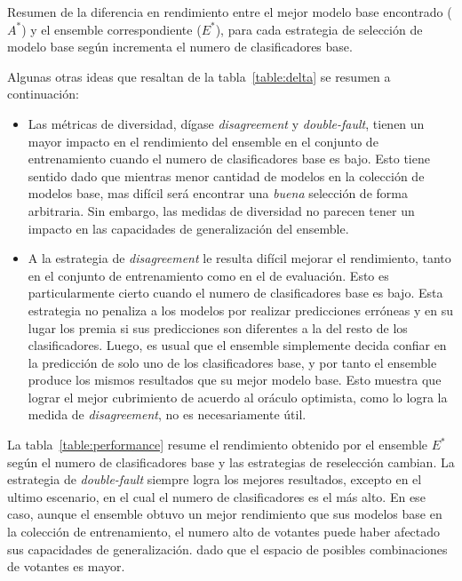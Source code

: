 \begin{table}[H]
    \caption{Resumen de la diferencia en rendimiento entre el mejor modelo base encontrado ($A^*$) y el ensemble correspondiente ($E^*$), para cada estrategia de selección de modelo base según incrementa el numero de clasificadores base.}
    \label{table:delta}
\end{table}

Algunas otras ideas que resaltan de la tabla~\ref{table:delta} se resumen a continuación:

\begin{itemize}
    \item
    Las métricas de diversidad, dígase \emph{disagreement} y \emph{double-fault}, tienen un mayor impacto en el rendimiento del ensemble en el conjunto de entrenamiento cuando el numero de clasificadores base es bajo.
    Esto tiene sentido dado que mientras menor cantidad de modelos en la colección de modelos base, mas difícil será encontrar una \textit{buena} selección de forma arbitraria.
    Sin embargo, las medidas de diversidad no parecen tener un impacto en las capacidades de generalización del ensemble.
    
    \item
    A la estrategia de \emph{disagreement} le resulta difícil mejorar el rendimiento, tanto en el conjunto de entrenamiento como en el de evaluación.
    Esto es particularmente cierto cuando el numero de clasificadores base es bajo.
    Esta estrategia no penaliza a los modelos por realizar predicciones erróneas y en su lugar los premia si sus predicciones son diferentes a la del resto de los clasificadores.
    Luego, es usual que el ensemble simplemente decida confiar en la predicción de solo uno de los clasificadores base, y por tanto el ensemble produce los mismos resultados que su mejor modelo base.
    Esto muestra que lograr el mejor cubrimiento de acuerdo al oráculo optimista, como lo logra la medida de \emph{disagreement}, no es necesariamente útil.
\end{itemize}

La tabla~\ref{table:performance} resume el rendimiento obtenido por el ensemble $E^*$ según el numero de clasificadores base y las estrategias de reselección cambian.
La estrategia de \emph{double-fault} siempre logra los mejores resultados, excepto en el ultimo escenario, en el cual el numero de clasificadores es el más alto.
En ese caso, aunque el ensemble obtuvo un mejor rendimiento que sus modelos base en la colección de entrenamiento, el numero alto de votantes puede haber afectado sus capacidades de generalización. dado que el espacio de posibles combinaciones de votantes es mayor.

